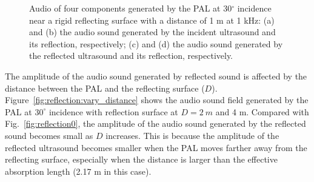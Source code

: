 \begin{figure}[!htb]
\begin{subfigure}{0.35\textwidth}
    \end{subfigure}
    \caption{Audio  of four components generated by the PAL at 30$^\circ$ incidence near a rigid reflecting surface with a distance of 1 m at 1 kHz: (a) and (b) the audio sound generated by the incident ultrasound and its reflection, respectively; (c) and (d) the audio sound generated by the reflected ultrasound and its reflection, respectively.}
    \label{fig:reflection:components}
\end{figure}
The amplitude of the audio sound generated by reflected sound is affected by the distance between the PAL and the reflecting surface ($D$). 
Figure~\ref{fig:reflection:vary_distance} shows the audio sound field generated by the PAL at $30^\circ$ incidence with reflection surface at $D = \SI{2}{m}$ and 4 m. 
Compared with Fig.~\ref{fig:reflection0}, the amplitude of the audio sound generated by the reflected sound becomes small as $D$ increases. 
This is because the amplitude of the reflected ultrasound becomes smaller when the PAL moves farther away from the reflecting surface, especially when the distance is larger than the effective absorption length (2.17 m in this case).

